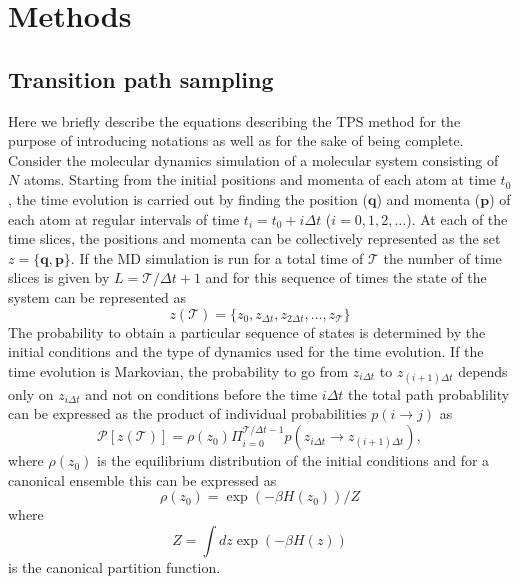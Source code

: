 \documentclass[journal=jpcbfk,manuscript=article,layout=traditional]{achemso}
\begin{document}
\section{Methods}
\subsection{Transition path sampling}
Here we briefly describe the equations describing the TPS method for the purpose of
introducing notations as well as for the sake of being complete. 
Consider the molecular dynamics simulation of a molecular system consisting 
of $N$ atoms. Starting from the initial positions and momenta of each atom at time $t_0$,
the time evolution is carried out by finding the position ($\textbf{q}$) and 
momenta ($\textbf{p}$) of each atom at regular intervals of time $t_i = t_0 + i\Delta t$  
($i = 0,1,2,\ldots$). At each of the time slices, the positions and 
momenta can be collectively represented as
the set $z = \{\textbf{q},\textbf{p}\}$. If the MD simulation is 
run for a total 
time of $\mathcal{T}$ the number of time slices is given by 
$L = \mathcal{T}/\Delta t +1$ and for this sequence of 
times the state of the system can be represented as 
\begin{equation}
z(\mathcal{T}) = \{z_0, z_{\Delta t}, z_{2\Delta t},\ldots,z_{\mathcal{T}}\}
\end{equation}
The probability to obtain a particular sequence of states is determined by the initial 
conditions and the type of dynamics used for the time evolution. If the time evolution is 
Markovian, the probability to go from $z_{i\Delta t}$ to $z_{(i+1)\Delta t}$ depends only 
on $z_{i\Delta t}$ and not on conditions before the time $i\Delta t$ the total path probablility can 
be expressed as the product of individual probabilities $p(i\rightarrow j)$ as 
\begin{equation}
\mathcal{P}[z(\mathcal{T})] = \rho(z_0)\Pi_{i=0}^{\mathcal{T}/\Delta t-1} p(z_{i\Delta t}\rightarrow z_{(i+1)\Delta t}),
\end{equation}
where $\rho(z_0)$ is the equilibrium distribution of the initial conditions and for a canonical ensemble this can be 
expressed as 
\begin{equation}
\rho(z_0) = \exp(-\beta H(z_0))/Z
\end{equation}
where 
\begin{equation}
Z = \int dz \exp(-\beta H(z)) 
\end{equation}
is the canonical partition function. 
\end{document}
